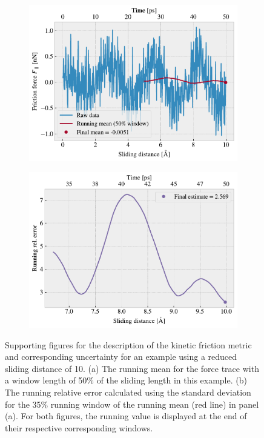 \begin{figure}[!htb]
  \centering
  \begin{subfigure}[t]{0.49\textwidth}
    \centering
    \includegraphics[width=\textwidth]{figures/baseline/Ff_runmean.pdf}
    \caption{}
    \label{fig:runmean}
  \end{subfigure}
  \hfill
  \begin{subfigure}[t]{0.49\textwidth}
      \centering
      \includegraphics[width=\textwidth]{figures/baseline/Ff_runstd.pdf}
      \caption{}
      \label{fig:runstd}
  \end{subfigure}
  \caption{Supporting figures for the description of the kinetic friction metric and corresponding uncertainty for an example using a reduced sliding distance of \SI{10}{{}}. (a) The running mean for the force trace with a window length of 50\% of the sliding length in this example. (b) The running relative error calculated using the standard deviation for the 35\% running window of the running mean (red line) in panel (a). For both figures, the running value is displayed at the end of their respective corresponding windows.}
  \label{fig:running}
\end{figure}

